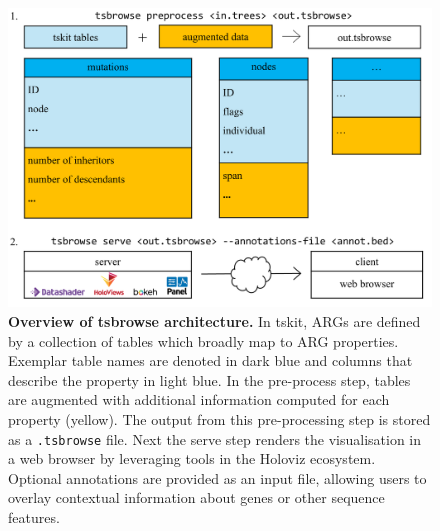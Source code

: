 \documentclass[unnumsec,webpdf,contemporary,large,namedate]{oup-authoring-template}%
\begin{document}
\begin{figure}
    \centering
    \includegraphics[width=0.95\linewidth]{manuscript/figures/MainFig1.png}
    \caption{\textbf{Overview of tsbrowse architecture. } 
    In tskit, ARGs are defined by a collection of tables which broadly map to ARG properties. Exemplar table names are denoted in dark blue and columns that describe the property in light blue. In the pre-process step, tables are augmented with additional information computed for each property (yellow). The output from this pre-processing step is stored as a \texttt{.tsbrowse} file. Next the serve step renders the visualisation in a web browser by leveraging tools in the Holoviz ecosystem. Optional annotations are provided as an input file, allowing users to overlay contextual information about genes or other sequence features. 
    }
    \label{fig:Figure_1}
\end{figure}
\end{document}
